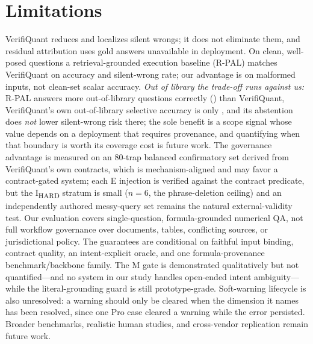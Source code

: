 \section{Limitations}\label{sec:limitations}
VerifiQuant reduces and localizes silent wrongs; it does not eliminate them, and residual attribution uses gold answers unavailable in deployment.
On clean, well-posed questions a retrieval-grounded execution baseline (R-PAL) matches VerifiQuant on accuracy and silent-wrong rate; our advantage is on malformed inputs, not clean-set scalar accuracy.
\emph{Out of library the trade-off runs against us:} R-PAL answers more out-of-library questions correctly (\oodRPALcorrOOD{}) than VerifiQuant, VerifiQuant's own out-of-library selective accuracy is only \oodVQselOOD{}, and its abstention does \emph{not} lower silent-wrong risk there; the sole benefit is a scope signal whose value depends on a deployment that requires provenance, and quantifying when that boundary is worth its coverage cost is future work.
The governance advantage is measured on an 80-trap balanced confirmatory set derived from VerifiQuant's own contracts, which is mechanism-aligned and may favor a contract-gated system; each E injection is verified against the contract predicate, but the I\textsubscript{HARD} stratum is small ($n{=}6$, the phrase-deletion ceiling) and an independently authored messy-query set remains the natural external-validity test.
Our evaluation covers single-question, formula-grounded numerical QA, not full workflow governance over documents, tables, conflicting sources, or jurisdictional policy.
The guarantees are conditional on faithful input binding, contract quality, an intent-explicit oracle, and one formula-provenance benchmark/backbone family.
The M gate is demonstrated qualitatively but not quantified---and no system in our study handles open-ended intent ambiguity---while the literal-grounding guard is still prototype-grade.
Soft-warning lifecycle is also unresolved: a warning should only be cleared when the dimension it names has been resolved, since one Pro case cleared a warning while the error persisted.
Broader benchmarks, realistic human studies, and cross-vendor replication remain future work.

